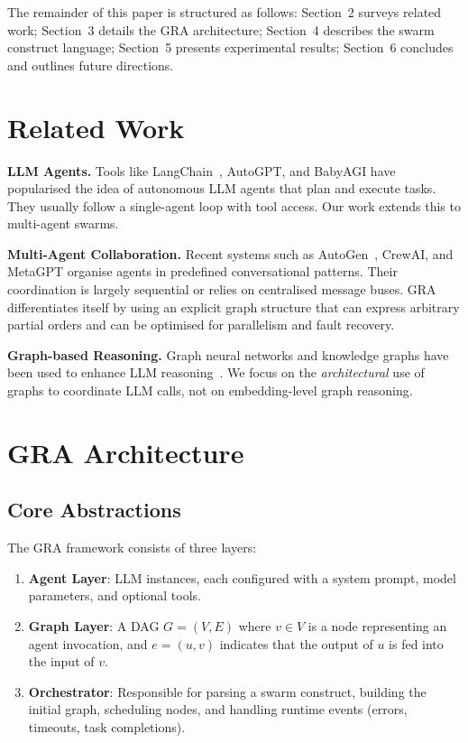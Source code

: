 \documentclass[11pt]{article}
\begin{document}
The remainder of this paper is structured as follows: Section~2 surveys related work; Section~3 details the GRA architecture; Section~4 describes the swarm construct language; Section~5 presents experimental results; Section~6 concludes and outlines future directions.

\section{Related Work}
\textbf{LLM Agents.} Tools like LangChain~\cite{langchain}, AutoGPT, and BabyAGI have popularised the idea of autonomous LLM agents that plan and execute tasks. 
They usually follow a single-agent loop with tool access. 
Our work extends this to multi-agent swarms.

\textbf{Multi-Agent Collaboration.} Recent systems such as AutoGen~\cite{autogen}, CrewAI, and MetaGPT organise agents in predefined conversational patterns. 
Their coordination is largely sequential or relies on centralised message buses. 
GRA differentiates itself by using an explicit graph structure that can express arbitrary partial orders and can be optimised for parallelism and fault recovery.

\textbf{Graph-based Reasoning.} Graph neural networks and knowledge graphs have been used to enhance LLM reasoning~\cite{yasunaga2021qa}. 
We focus on the \emph{architectural} use of graphs to coordinate LLM calls, not on embedding-level graph reasoning.

\section{GRA Architecture}
\subsection{Core Abstractions}
The GRA framework consists of three layers:
\begin{enumerate}
    \item \textbf{Agent Layer}: LLM instances, each configured with a system prompt, model parameters, and optional tools.
    \item \textbf{Graph Layer}: A DAG $G=(V,E)$ where $v \in V$ is a node representing an agent invocation, and $e = (u,v)$ indicates that the output of $u$ is fed into the input of $v$.
    \item \textbf{Orchestrator}: Responsible for parsing a swarm construct, building the initial graph, scheduling nodes, and handling runtime events (errors, timeouts, task completions).
\end{enumerate}
\end{document}
